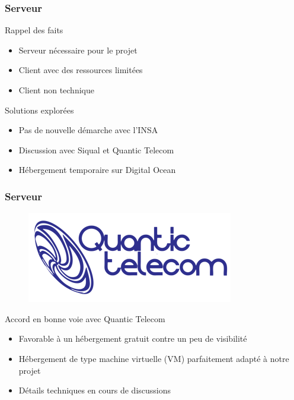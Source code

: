 \speaker{\Matthieu}

\begin{frame}
	\frametitle{Serveur}
	\begin{block}{Rappel des faits}
      \begin{itemize}
        \item Serveur nécessaire pour le projet
        \item Client avec des ressources limitées
        \item Client non technique
      \end{itemize}
     \end{block}

	\begin{block}{Solutions explorées}
      \begin{itemize}
        \item Pas de nouvelle démarche avec l'INSA
        \item Discussion avec Siqual et Quantic Telecom
        \item Hébergement temporaire sur Digital Ocean
      \end{itemize}
     \end{block}
\end{frame}

\begin{frame}
	\frametitle{Serveur}

    \begin{figure}[r]
		\includegraphics[scale=0.3]{images/quantic.png}
	\end{figure}
	
    \begin{block}{Accord en bonne voie avec Quantic Telecom}
	  \begin{itemize}
		\item Favorable à un hébergement gratuit contre un peu de visibilité
		\item Hébergement de type machine virtuelle (VM) parfaitement adapté à notre projet
		\item Détails techniques en cours de discussions
	  \end{itemize}
	\end{block}
\end{frame}

